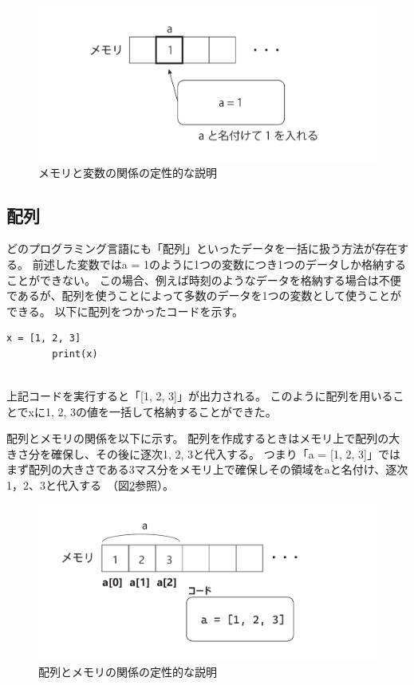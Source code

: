\documentclass[]{ltjsarticle}
\begin{document}
	\begin{figure}
		\centering
		\includegraphics[width=0.8\linewidth]{figs/memory_explain1.pdf}
		\caption{メモリと変数の関係の定性的な説明}
		\label{fig:memory1}
	\end{figure}

	\subsection{配列}
	どのプログラミング言語にも「配列」といったデータを一括に扱う方法が存在する。
	前述した変数ではa = 1のように1つの変数につき1つのデータしか格納することができない。
	この場合、例えば時刻のようなデータを格納する場合は不便であるが、配列を使うことによって多数のデータを1つの変数として使うことができる。
	以下に配列をつかったコードを示す。
	\begin{lstlisting}[caption=array.py, label=array]
		x = [1, 2, 3]
		print(x)
	
	\end{lstlisting}
	上記コードを実行すると「[1, 2, 3]」が出力される。
	このように配列を用いることでxに1, 2, 3の値を一括して格納することができた。

	配列とメモリの関係を以下に示す。
	配列を作成するときはメモリ上で配列の大きさ分を確保し、その後に逐次1, 2, 3と代入する。
	つまり「a = [1, 2, 3]」ではまず配列の大きさである3マス分をメモリ上で確保しその領域をaと名付け、逐次1，2、3と代入する~（図\ref{fig:memory2}参照）。
	\begin{figure}
		\centering
		\includegraphics[width=0.8\linewidth]{figs/memory2.pdf}
		\caption{配列とメモリの関係の定性的な説明}
		\label{fig:memory2}
	\end{figure}
\end{document}

